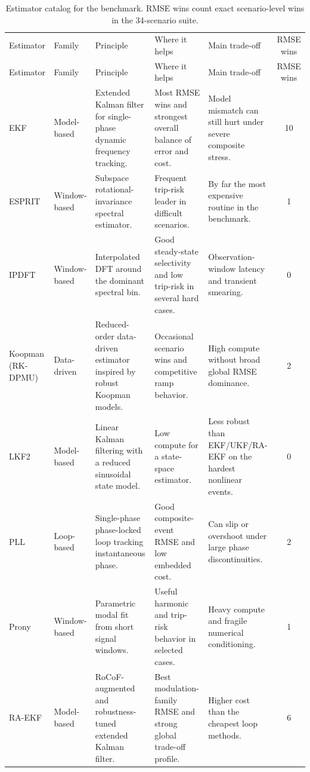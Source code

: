 \begin{longtable}{L{2.25cm} L{1.55cm} L{3.2cm} L{3.6cm} L{3.8cm} c}
\caption{Estimator catalog for the benchmark. RMSE wins count exact scenario-level wins in the 34-scenario suite.}\label{tab:estimator_catalog}\\
\scriptsize\\
\toprule
Estimator & Family & Principle & Where it helps & Main trade-off & RMSE wins \\
\midrule
\endfirsthead
\toprule
Estimator & Family & Principle & Where it helps & Main trade-off & RMSE wins \\
\midrule
\endhead
\bottomrule
\endfoot
EKF & Model-based & Extended Kalman filter for single-phase dynamic frequency tracking. & Most RMSE wins and strongest overall balance of error and cost. & Model mismatch can still hurt under severe composite stress. & 10 \\
ESPRIT & Window-based & Subspace rotational-invariance spectral estimator. & Frequent trip-risk leader in difficult scenarios. & By far the most expensive routine in the benchmark. & 1 \\
IPDFT & Window-based & Interpolated DFT around the dominant spectral bin. & Good steady-state selectivity and low trip-risk in several hard cases. & Observation-window latency and transient smearing. & 0 \\
Koopman (RK-DPMU) & Data-driven & Reduced-order data-driven estimator inspired by robust Koopman models. & Occasional scenario wins and competitive ramp behavior. & High compute without broad global RMSE dominance. & 2 \\
LKF2 & Model-based & Linear Kalman filtering with a reduced sinusoidal state model. & Low compute for a state-space estimator. & Less robust than EKF/UKF/RA-EKF on the hardest nonlinear events. & 0 \\
PLL & Loop-based & Single-phase phase-locked loop tracking instantaneous phase. & Good composite-event RMSE and low embedded cost. & Can slip or overshoot under large phase discontinuities. & 2 \\
Prony & Window-based & Parametric modal fit from short signal windows. & Useful harmonic and trip-risk behavior in selected cases. & Heavy compute and fragile numerical conditioning. & 1 \\
RA-EKF & Model-based & RoCoF-augmented and robustness-tuned extended Kalman filter. & Best modulation-family RMSE and strong global trade-off profile. & Higher cost than the cheapest loop methods. & 6 \\

\end{longtable}
